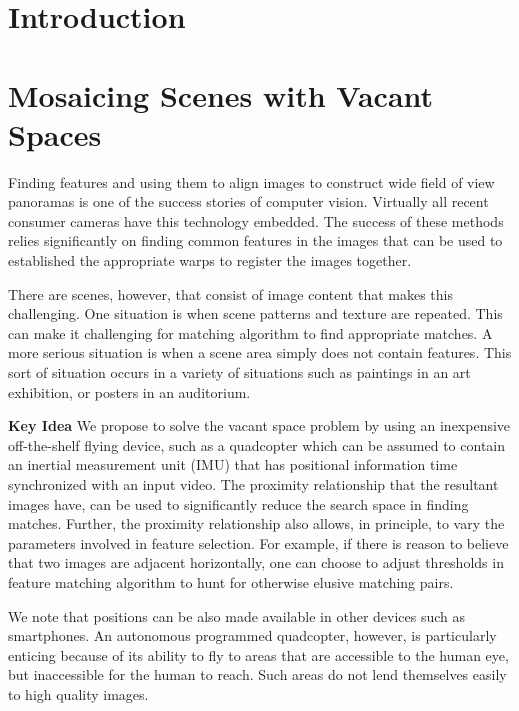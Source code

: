 \documentclass[11pt]{article}
\def\baselinestretch{1.15}
\begin{document}
\newpage

\section{Introduction}

\section{Mosaicing Scenes with Vacant Spaces}

Finding features and using them to align images to construct wide field
of view panoramas is one of the success stories of
computer vision.  Virtually all recent consumer cameras have this
technology embedded.  The success of these methods relies significantly on
finding common features in the images that can be used to established the
 appropriate warps to register the images together.

There are scenes, however, that consist of image content that makes this
challenging.  One situation is when scene patterns and texture are repeated.  
This can make it challenging for matching algorithm to find appropriate matches.
A more serious situation is when a scene area simply
does not contain features.  This sort of situation occurs in a variety
of situations such as paintings in an art exhibition, or posters in an
auditorium.

{\bf Key Idea} We propose to solve the vacant space problem by using
an inexpensive off-the-shelf flying device, such as a quadcopter which
can be assumed to contain an inertial measurement unit (IMU) that has
positional information time synchronized with an input video.  The
proximity relationship that the resultant images have, can be used to
significantly reduce the search space in finding matches.  Further,
the proximity relationship also allows, in principle, to vary the
parameters involved in feature selection. For example, if there is
reason to believe that two images are adjacent horizontally, one can
choose to adjust thresholds in feature matching algorithm to hunt for
otherwise elusive matching pairs.

We note that positions can be also made available in other devices
such as smartphones.  An autonomous programmed quadcopter, however, is
particularly enticing because of its ability to fly to areas that are
accessible to the human eye, but inaccessible for the
human to reach.  Such areas do not lend themselves easily to high
quality images.
\end{document}
